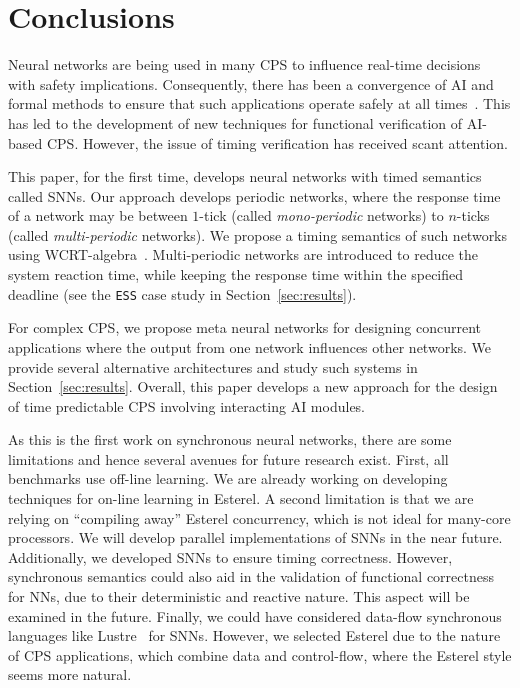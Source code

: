 \section{Conclusions}
\label{sec:conclusions}

Neural networks are being used in many \acf{CPS} to influence
real-time decisions with safety implications. Consequently, there has
been a convergence of AI and formal methods to ensure that such
applications operate safely at all times~\cite{seshia2016towards}. This has led to the development of new
techniques for functional verification of AI-based \ac{CPS}. However,
the issue of timing verification has received scant attention. 

This paper, for the first time, develops neural networks with timed
semantics called \acfp{SNN}. Our approach develops periodic networks,
where the response time of a network may be between $1$-tick (called
\emph{mono-periodic} networks) to $n$-ticks (called
\emph{multi-periodic} networks). We propose a timing semantics of such
networks using \ac{WCRT}-algebra~\cite{wang2017timing}. Multi-periodic networks are
introduced to reduce the system reaction time, while keeping the
response time within the specified deadline (see the \texttt{ESS} case
study in Section~\ref{sec:results}). 

For complex CPS, we propose meta neural networks for designing concurrent applications where the output from
one network influences other networks. We provide several alternative
architectures and study such systems in
Section~\ref{sec:results}. Overall, this paper develops a new approach
for the design of time predictable \acf{CPS} involving interacting 
AI modules.

As this is the first work on synchronous neural networks,
there are some limitations and hence several avenues
for future research exist. First, all benchmarks use off-line learning. We are already
working on developing techniques for on-line learning in Esterel. A
second limitation is that we are relying on ``compiling away'' Esterel
concurrency, which is not ideal for many-core processors. We will develop parallel implementations
of \acp{SNN} in the near future. 
Additionally, we developed \acp{SNN} to ensure timing correctness. 
However, synchronous semantics could also aid in the
validation of functional correctness for \acp{NN}, due to their
deterministic and reactive nature. This aspect will be examined in the future.
Finally, we could have considered
data-flow synchronous languages like Lustre~\cite{benveniste2003synchronous} for
\acp{SNN}. However, we selected Esterel due to the nature of \ac{CPS}
applications, which combine data and control-flow, where the Esterel
style seems more natural.